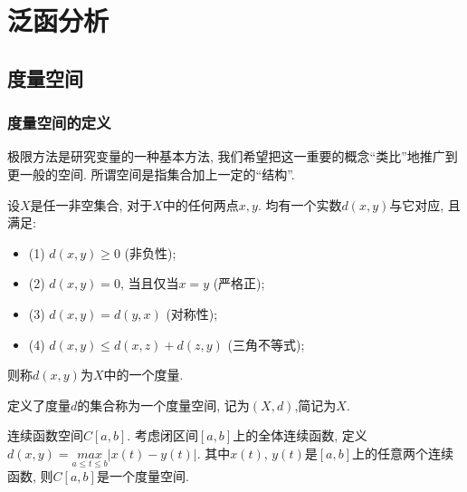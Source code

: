\documentclass[lang=cn,10pt]{gorgeousnbook}
\numberwithin{equation}{section}%
\numberwithin{figure}{section}%
\begin{document}


%
\chapter{泛函分析}
\section{度量空间}
\subsection{度量空间的定义}

极限方法是研究变量的一种基本方法, 我们希望把这一重要的概念“类比”地推广到更一般的空间. 所谓空间是指集合加上一定的“结构”. 

\begin{definition}[度量空间的定义] \label{def:int} 
设$X$是任一非空集合, 对于$X$中的任何两点$x,y$. 均有一个实数$d(x,y)$与它对应, 且满足:
\begin{itemize}
  \item (1) $d(x,y)\geq 0 $ (非负性); 
  \item (2) $d(x,y) = 0$, 当且仅当$x=y$ (严格正); 
  \item (3) $d(x,y) = d(y,x)$ (对称性); 
  \item (4) $d(x,y) \leq d(x,z)+d(z,y)$ (三角不等式); 
\end{itemize}
则称$d(x,y)$为$X$中的一个度量. 
\end{definition}

定义了度量$d$的集合称为一个度量空间, 记为$(X,d)$,简记为$X$.
\begin{exercise}\label{exer:43}
连续函数空间$C[a,b]$. 考虑闭区间$[a,b]$上的全体连续函数, 定义$d(x,y) = \underset{a\le t\le b}{max}\left| x\left( t \right) -y\left( t \right) \right|$. 其中$x(t)$, $y(t)$是$[a,b]$上的任意两个连续函数, 则$C[a,b]$是一个度量空间.
\end{exercise}
\end{document}
